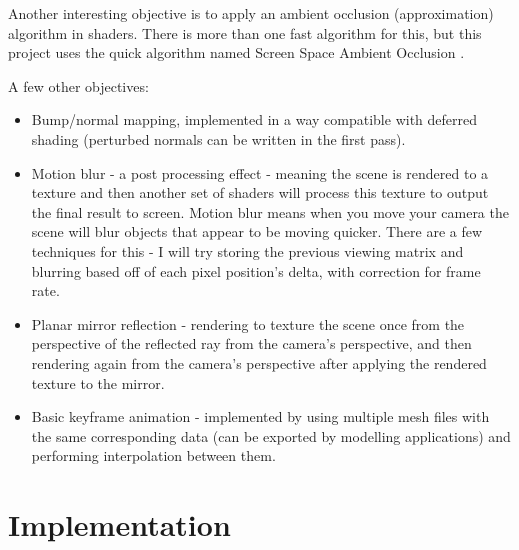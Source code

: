 \documentclass[oneside]{book}
\begin{document}
    Another interesting objective is to apply an ambient occlusion (approximation) algorithm in shaders. There is more than one fast algorithm for this, but this project uses the quick algorithm named Screen Space Ambient Occlusion \cite{kajalinshaderx7}\cite{mittring2007finding}.

    A few other objectives:
    \begin{itemize}
      \item
        Bump/normal mapping, implemented in a way compatible with deferred shading (perturbed normals can be written in the first pass).

      \item
        Motion blur - a post processing effect - meaning the scene is rendered to a texture and then another set of shaders will process this texture to output the final result to screen. Motion blur means when you move your camera the scene will blur objects that appear to be moving quicker. There are a few techniques for this - I will try storing the previous viewing matrix and blurring based off of each pixel position's delta, with correction for frame rate.

      \item
        Planar mirror reflection - rendering to texture the scene once from the perspective of the reflected ray from the camera's perspective, and then rendering again from the camera's perspective after applying the rendered texture to the mirror.

      \item
        Basic keyframe animation - implemented by using multiple mesh files with the same corresponding data (can be exported by modelling applications) and performing interpolation between them.

    \end{itemize}


  \section{Implementation}
\end{document}
